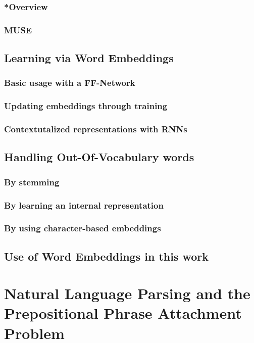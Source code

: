 \subsubsection{*Overview}
\subsubsection{MUSE}
\subsection{Learning via Word Embeddings}
\subsubsection{Basic usage with a FF-Network}
\subsubsection{Updating embeddings through training}
\subsubsection{Contextutalized representations with RNNs}
\subsection{Handling Out-Of-Vocabulary words}
\subsubsection{By stemming}
\subsubsection{By learning an internal representation}
\subsubsection{By using character-based embeddings}
\subsection{Use of Word Embeddings in this work}
\pagebreak


\section{Natural Language Parsing and the Prepositional Phrase Attachment Problem}
